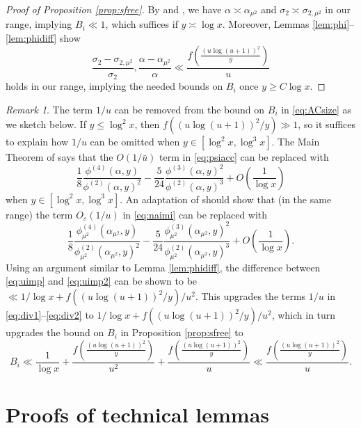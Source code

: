 \documentclass{amsart}
\theoremstyle{plain}
\theoremstyle{remark}
\newtheorem{rem}{Remark}
\newcommand{\ubar}{\bar{u}}
\begin{document}
\begin{proof}[Proof of Proposition \ref{prop:sfree}]
	By \cite[Thm.~2]{HildebrandTenenbaum1986} and \cite[Lems.~2.8--2.9]{TenenbaumSfree}, we have $\alpha \asymp \alpha_{\mu^2} $ and $\sigma_{2} \asymp  \sigma_{2,\mu^2} $ in our range, implying $B_i \ll 1$, which suffices if $y \asymp \log x$. Moreover, Lemmas \ref{lem:phi}--\ref{lem:phidiff} show \[\frac{\sigma_2 - \sigma_{2,\mu^2}}{\sigma_2},\frac{\alpha-\alpha_{\mu^2}}{\alpha} \ll \frac{f\left( \frac{(u\log(u+1))^2}{y}\right)}{u}\]	
	holds in our range,	implying the needed bounds on $B_i$ once $y \ge C \log x$.
\end{proof}
\begin{rem}\label{rem:sfree}
	The term $1/u$ can be removed from the bound on $B_i$ in \eqref{eq:ACsize} as we sketch below. If $y \le \log^2 x$, then $f((u\log(u+1))^2/y) \gg 1$, so it suffices to explain how $1/u$ can be omitted when $y \in [\log^2 x,\log^3x]$. The Main Theorem of \cite{Saha} says that the $O(1/\ubar)$ term in \eqref{eq:psiacc} can be replaced with
	\begin{equation}\label{eq:uimp} \frac{1}{8} \frac{\phi^{(4)}(\alpha,y)}{\phi^{(2)}(\alpha,y)^2} - \frac{5}{24} \frac{\phi^{(3)}(\alpha,y)^2}{\phi^{(2)}(\alpha,y)^3} + O\left(\frac{1}{\log x}\right)
	\end{equation}
	when $y \in [\log^2 x,\log^3x]$. An adaptation of \cite{Saha} should show that (in the same range) the term $O_{\varepsilon}(1/u)$ in \eqref{eq:naimi}
	can be replaced with 
	\begin{equation}\label{eq:uimp2} \frac{1}{8} \frac{\phi_{\mu^2}^{(4)}(\alpha_{\mu^2},y)}{\phi_{\mu^2}^{(2)}(\alpha_{\mu^2},y)^2} - \frac{5}{24} \frac{\phi_{\mu^2}^{(3)}(\alpha_{\mu^2},y)^2}{\phi_{\mu^2}^{(2)}(\alpha_{\mu^2},y)^3} + O\left(\frac{1}{\log x}\right).
	\end{equation}
	Using an argument similar to Lemma \ref{lem:phidiff}, the difference between \eqref{eq:uimp} and \eqref{eq:uimp2} can be shown to be $\ll 1/\log x + f((u\log(u+1))^2/y)/u^2$. This upgrades the terms $1/u$ in \eqref{eq:div1}--\eqref{eq:div2} to $1/\log x+ f((u\log(u+1))^2/y)/u^2$, which in turn upgrades the bound on $B_i$ in Proposition \ref{prop:sfree} to 
	\[ B_i \ll \frac{1}{\log x} + \frac{f\left(\frac{(u\log(u+1))^2}{y}\right)}{u^2} +  \frac{f\left(\frac{(u\log(u+1))^2}{y}\right)}{u} \ll   \frac{f\left(\frac{(u\log(u+1))^2}{y}\right)}{u}.\]
\end{rem}

\section{Proofs of technical lemmas}\label{sec:technical}
\end{document}

